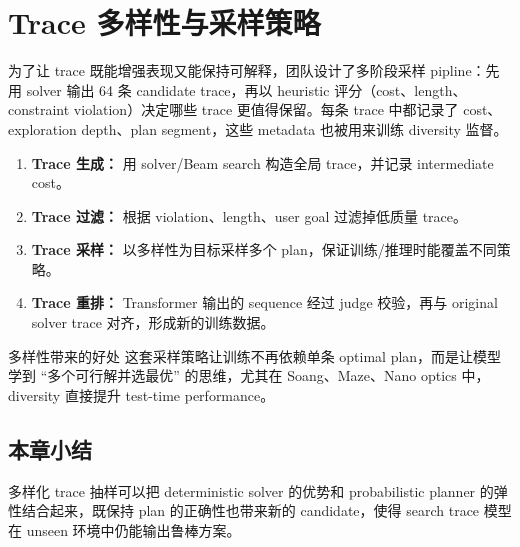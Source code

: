 \section{Trace 多样性与采样策略}

为了让 trace 既能增强表现又能保持可解释，团队设计了多阶段采样 pipline：先用 solver 输出 64 条 candidate trace，再以 heuristic 评分（cost、length、constraint violation）决定哪些 trace 更值得保留。每条 trace 中都记录了 cost、exploration depth、plan segment，这些 metadata 也被用来训练 diversity 监督。
\begin{enumerate}
    \item \textbf{Trace 生成：} 用 solver/Beam search 构造全局 trace，并记录 intermediate cost。
    \item \textbf{Trace 过滤：} 根据 violation、length、user goal 过滤掉低质量 trace。
    \item \textbf{Trace 采样：} 以多样性为目标采样多个 plan，保证训练/推理时能覆盖不同策略。
    \item \textbf{Trace 重排：} Transformer 输出的 sequence 经过 judge 校验，再与 original solver trace 对齐，形成新的训练数据。
\end{enumerate}
\begin{knowledgebox}{多样性带来的好处}
这套采样策略让训练不再依赖单条 optimal plan，而是让模型学到 ``多个可行解并选最优'' 的思维，尤其在 Soang、Maze、Nano optics 中，diversity 直接提升 test-time performance。
\end{knowledgebox}

\subsection{本章小结}

多样化 trace 抽样可以把 deterministic solver 的优势和 probabilistic planner 的弹性结合起来，既保持 plan 的正确性也带来新的 candidate，使得 search trace 模型在 unseen 环境中仍能输出鲁棒方案。

